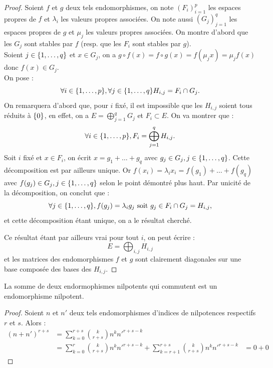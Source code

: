 \begin{proof}
Soient $f$ et $g$ deux tels endomorphismes, on note $(F_i)_{i=1}^p$ les espaces propres de $f$ et $\lambda_i$ les valeurs propres
associées. On note aussi $(G_j)_{j=1}^q$ les espaces propres de $g$ et $\mu_j$ les valeurs propres associées. 
On montre d'abord que les $G_j$ sont stables par $f$ (resp. que les $F_i$ sont stables par $g$). \\
Soient $j \in \{ 1, \dots, q \}$ et $x \in G_j$, on a $g \circ f(x) = f \circ g (x) = f(\mu_j x) = \mu_j f(x)$ donc $f(x) \in G_j$. \\

On pose :
\[ \forall i \in \{ 1, \dots, p \}, \forall j \in \{ 1, \dots, q \} H_{i,j} = F_i \cap G_j . \]
On remarquera d'abord que, pour $i$ fixé, il est impossible que les $H_{i,j}$ soient tous réduits à $\{ 0 \}$,
en effet, on a $E = \bigoplus_{j=1}^q G_j$ et $F_i \subset E$. 
On va montrer que :
\[ \forall i \in \{ 1, \dots, p  \}, F_i = \bigoplus_{j=1}^q H_{i,j} . \]
Soit $i$ fixé et $x \in F_i$, on écrit $x = g_1 + \dots + g_q$ avec $g_j \in G_j, j \in \{ 1, \dots, q \}$. Cette décomposition est par ailleurs
unique. Or $f(x_i) = \lambda_i x_i = f(g_1) + \dots + f(g_q)$ avec $f(g_j) \in G_j, j \in \{ 1, \dots, q \}$ selon le point démontré plus haut.
Par unicité de la décomposition, on conclut que :
\[ \forall j \in \{ 1, \dots, q \}, f(g_j) = \lambda_i g_j \text{ soit } g_j \in F_i \cap G_j = H_{i,j} , \]
et cette décomposition étant unique, on a le résultat cherché. \newline

Ce résultat étant par ailleurs vrai pour tout $i$, on peut écrire :
\[ E =  \bigoplus_{i, j} H_{i,j} \]
et les matrices des endomorphismes $f$ et $g$ sont clairement diagonales sur une base composée des bases des $H_{i,j}$.
\end{proof}

\begin{lem}
\label{lem:sommenil}
La somme de deux endormophismes nilpotents qui commutent est un endomorphisme nilpotent.
\end{lem}

\begin{proof}
Soient $n$ et $n'$ deux tels endomorphismes d'indices de nilpotences respectifs $r$ et $s$. Alors :
\begin{align*}
(n+n')^{r+s} & = \sum_{k=0}^{r+s} \binom{k}{r+s} n^k n'^{r+s-k} \\
& = \sum_{k=0}^{r} \binom{k}{r+s} n^k n'^{r+s-k} + \sum_{k=r+1}^{r+s} \binom{k}{r+s} n^k n'^{r+s-k}
& = 0 + 0 
\end{align*}
\end{proof}

